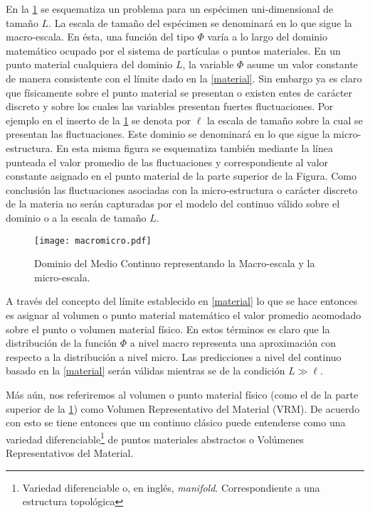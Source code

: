 \documentclass[../notas medios.tex]{subfiles}
\begin{document}
En la \cref{macromicro} se esquematiza un problema para un espécimen
uni-dimensional de tamaño $L$.  La escala de tamaño del espécimen se denominará en lo que sigue la macro-escala.  En ésta, una función del tipo $\Phi$ varía a lo largo del dominio matemático ocupado por el sistema de partículas o puntos materiales.  En un punto material cualquiera del dominio $L$, la variable $\Phi$ asume un valor constante de manera consistente con el límite dado en la \cref{material}. Sin embargo ya es claro que físicamente sobre el punto material se presentan o existen entes de carácter discreto y sobre los cuales las variables presentan fuertes fluctuaciones.  Por ejemplo en el inserto de la \cref{macromicro} se denota por $\ell$ la escala de tamaño sobre la cual se presentan las fluctuaciones.  Este dominio se denominará en lo que sigue la micro-estructura.  En esta misma figura se esquematiza también mediante la línea punteada el valor promedio de las fluctuaciones y correspondiente al valor constante asignado en el punto material de la parte superior de la Figura.  Como conclusión las fluctuaciones asociadas con la micro-estructura o carácter discreto de la materia no serán capturadas por el modelo del continuo válido sobre el dominio o a la escala de tamaño $L$.

\begin{figure}[H]
\centering
	\texttt{[image: macromicro.pdf]}
	\caption{Dominio del Medio Continuo representando la Macro-escala y la micro-escala.}
	\label{macromicro}
\end{figure}


A través del concepto del límite establecido en \cref{material} lo que se hace entonces es asignar al volumen o punto material matemático el valor promedio acomodado sobre el punto o volumen material físico.  En estos términos es claro que la distribución de la función $\Phi$ a nivel macro representa una aproximación con respecto a la distribución a nivel micro.  Las predicciones a nivel del continuo basado en la \cref{material} serán válidas mientras se de la condición $L \gg \ell $.

Más aún, nos referiremos al volumen o punto material físico (como el de la 
parte superior de la \cref{macromicro}) como Volumen Representativo del 
Material (VRM).  De acuerdo con esto se tiene entonces que un continuo clásico 
puede entenderse como una variedad diferenciable\footnote{Variedad 
diferenciable o, en inglés, \emph{manifold}.  Correspondiente a una 
estructura topológica} de puntos materiales abstractos o Volúmenes 
Representativos del Material.
\end{document}
